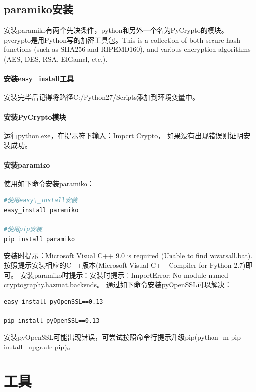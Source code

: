 \documentclass{book}
\begin{document}
\subsection{paramiko安装}

安装paramiko有两个先决条件，python和另外一个名为PyCrypto的模块。
pycrypto是用Python写的加密工具包。This is a collection of both secure hash functions (such as SHA256 and RIPEMD160), 
and various encryption algorithms (AES, DES, RSA, ElGamal, etc.).

\paragraph{安装easy\_install工具}安装完毕后记得将路径C:/Python27/Scripts添加到环境变量中。


\paragraph{安装PyCrypto模块}运行python.exe，在提示符下输入：Import  Crypto，
如果没有出现错误则证明安装成功。

\paragraph{安装paramiko}

使用如下命令安装paramiko：

\begin{lstlisting}[language=Bash]
#使用easy\_install安装
easy_install paramiko

#使用pip安装
pip install paramiko
\end{lstlisting}

安装时提示：Microsoft Visual C++ 9.0 is required (Unable to find vcvarsall.bat).
按照提示安装相应的C++版本(Microsoft Visual C++ Compiler for Python 2.7)即可。
安装paramiko时提示：安装时提示：ImportError: No module named cryptography.hazmat.backends。
通过如下命令安装pyOpenSSL可以解决：

\begin{lstlisting}[language=Bash]
easy_install pyOpenSSL==0.13

pip install pyOpenSSL==0.13
\end{lstlisting}

安装pyOpenSSL可能出现错误，可尝试按照命令行提示升级pip(python -m pip install --upgrade pip)。

\section{工具}
\end{document}
